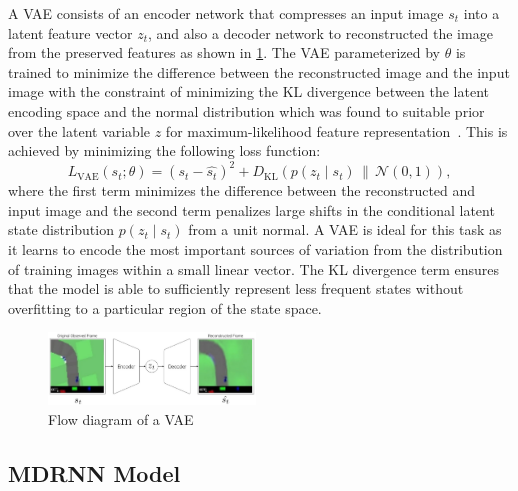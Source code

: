 A VAE consists of an encoder network that compresses an input image $s_t$ into a latent feature vector $z_t$, and also a decoder network to reconstructed the image from the preserved features as shown in \cref{fig:vae}. The VAE parameterized by $\theta$ is trained to minimize the difference between the reconstructed image and the input image with the constraint of minimizing the KL divergence between the latent encoding space and the normal distribution which was found to suitable prior over the latent variable $z$ for maximum-likelihood feature representation~\cite{diederik2014auto}. This is achieved by minimizing the following loss function: 
\begin{equation}
    L_{\mathrm{VAE}}(s_t;\theta) = (s_t - \hat{s_t})^2 + D_{\mathrm{KL}}(p(z_t \mid s_t)\,\|\,\mathcal{N}(0,1)),
\end{equation}
where the first term minimizes the difference between the reconstructed and input image and the second term penalizes large shifts in the conditional latent state distribution $p(z_t \mid s_t)$ from a unit normal. A VAE is ideal for this task as it learns to encode the most important sources of variation from the distribution of training images within a small linear vector. The KL divergence term ensures that the model is able to sufficiently represent less frequent states without overfitting to a particular region of the state space.
\begin{figure}[h]
	\centering
	\includegraphics[width=0.49\textwidth]{images/vaes2.pdf}
	\caption{Flow diagram of a VAE \cite{ha2018recurrent}}\label{fig:vae}
\end{figure}

\subsection{MDRNN Model}

